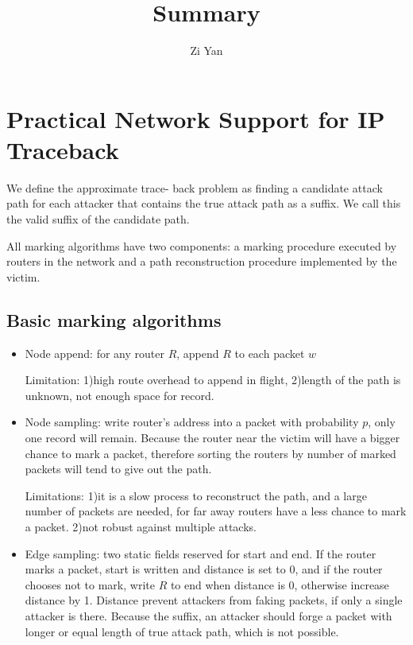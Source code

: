 \documentclass[]{article}
\begin{document}
\title{Summary}
\author{Zi Yan}
\date{}
\maketitle

\section{Practical Network Support for IP Traceback}
We define the approximate trace- back problem as finding a candidate 
attack path for each attacker that contains the true attack path as a suffix. 
We call this the valid suffix of the candidate path.

All marking algorithms have two components: a marking procedure 
executed by routers in the network and a path reconstruction 
procedure implemented by the victim.

\subsection{Basic marking algorithms}
\begin{itemize}
 \item Node append: for any router $R$, append $R$ to each packet $w$
 
 Limitation: 1)high route overhead to append in flight, 2)length of the path is
 unknown, not enough space for record. 
 
 \item Node sampling: write router's address into a packet with probability
 $p$, only one record will remain. Because the router near the victim will
 have a bigger chance to mark a packet, therefore sorting the routers by number
 of marked packets will tend to give out the path.
 
 Limitations: 1)it is a slow process to reconstruct the path, and a large number
 of packets are needed, for far away routers have a less chance to mark a 
 packet. 2)not robust against multiple attacks.
 
 \item Edge sampling: two static fields reserved for start and end. If the router
 marks a packet, start is written and distance is set to 0, and if the router
 chooses not to mark, write $R$ to end when distance is 0, otherwise
 increase distance by 1. Distance prevent attackers from faking packets,
 if only a single attacker is there. Because the suffix, an attacker should
 forge a packet with longer or equal length of true attack path, which is 
 not possible.

\end{itemize}
\end{document}
